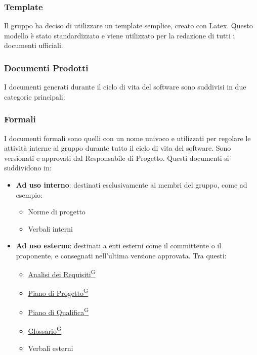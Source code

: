 \subsubsection{Template}
Il gruppo ha deciso di utilizzare un template semplice, creato con Latex. Questo modello è stato 
standardizzato e viene utilizzato per la redazione di tutti i documenti ufficiali.

\subsubsection{Documenti Prodotti}

I documenti generati durante il ciclo di vita del software sono suddivisi in due categorie principali:

\subsubsection*{Formali}
I documenti formali sono quelli con un nome univoco e utilizzati per regolare le attività interne al gruppo 
durante tutto il ciclo di vita del software. 
Sono versionati e approvati dal Responsabile di Progetto. 
Questi documenti si suddividono in:
\begin{itemize}
    \item \textbf{Ad uso interno}: destinati esclusivamente ai membri del gruppo, come ad esempio:
    \begin{itemize}
        \item Norme di progetto
        \item Verbali interni
    \end{itemize}
    \item \textbf{Ad uso esterno}: destinati a enti esterni come il committente o il proponente, e consegnati 
    nell'ultima versione approvata. Tra questi:
    \begin{itemize}
        \item \href{https://code7crusaders.github.io/docs/PB/documentazione_interna/glossario.html#analisi-dei-requisiti}{Analisi dei Requisiti\textsuperscript{G}}
        \item \href{https://code7crusaders.github.io/docs/PB/documentazione_interna/glossario.html#piano-di-progetto}{Piano di Progetto\textsuperscript{G}}
        \item \href{https://code7crusaders.github.io/docs/PB/documentazione_interna/glossario.html#piano-di-qualifica}{Piano di Qualifica\textsuperscript{G}}
        \item \href{https://code7crusaders.github.io/docs/PB/documentazione_interna/glossario.html#glossario}{Glossario\textsuperscript{G}}
        \item Verbali esterni
    \end{itemize}
\end{itemize}

